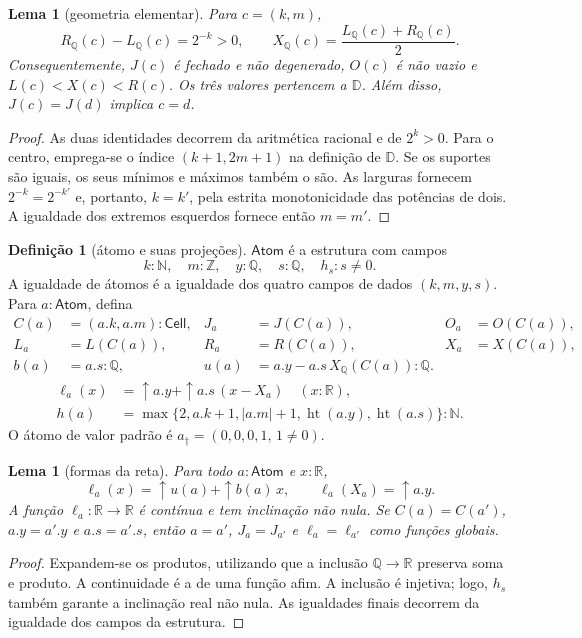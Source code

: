 \documentclass[12pt,a4paper]{article}
\theoremstyle{preciso}
\newtheorem{lema}[teorema]{Lema}
\theoremstyle{definition}
\newtheorem{definicao}[teorema]{Definição}
\newcommand{\N}{\mathbb N}
\newcommand{\Z}{\mathbb Z}
\newcommand{\Q}{\mathbb Q}
\newcommand{\R}{\mathbb R}
\newcommand{\D}{\mathbb D}
\newcommand{\Atoms}{\mathsf{Atom}}
\newcommand{\Cell}{\mathsf{Cell}}
\newcommand{\htq}{\operatorname{ht}}
\theoremstyle{preciso}
\theoremstyle{preciso}
\theoremstyle{preciso}
\theoremstyle{preciso}
\theoremstyle{definition}
\theoremstyle{preciso}
\theoremstyle{definition}
\theoremstyle{preciso}
\theoremstyle{preciso}
\theoremstyle{definition}
\begin{document}
\begin{lema}[geometria elementar]\label{map:normalizacao:2.3}\label{normalizacao:lem:geometry}
Para $c=(k,m)$,
\[
 R_\Q(c)-L_\Q(c)=2^{-k}>0,\qquad
 X_\Q(c)=\frac{L_\Q(c)+R_\Q(c)}2.
\]
Consequentemente, $J(c)$ é fechado e não degenerado, $O(c)$ é não
vazio e $L(c)<X(c)<R(c)$. Os três valores pertencem a $\D$.
Além disso, $J(c)=J(d)$ implica $c=d$.
\end{lema}
\begin{proof}
As duas identidades decorrem da aritmética racional e de $2^k>0$.
Para o centro, emprega-se o índice $(k+1,2m+1)$ na definição de $\D$.
Se os suportes são iguais, os seus mínimos e máximos também o são.
As larguras fornecem $2^{-k}=2^{-k'}$ e, portanto, $k=k'$, pela estrita
monotonicidade das potências de dois. A igualdade dos extremos
esquerdos fornece então $m=m'$.
\end{proof}

\begin{definicao}[átomo e suas projeções]\label{map:normalizacao:2.4}\label{normalizacao:def:atom}
$\Atoms$ é a estrutura com campos
\[
 k:\N,\quad m:\Z,\quad y:\Q,\quad s:\Q,\quad h_s:s\ne0.
\]
A igualdade de átomos é a igualdade dos quatro campos de dados
$(k,m,y,s)$. Para $a:\Atoms$, defina
\begin{align*}
 C(a)&=(a.k,a.m):\Cell, & J_a&=J(C(a)), & O_a&=O(C(a)),\\
 L_a&=L(C(a)),&R_a&=R(C(a)),&X_a&=X(C(a)),\\
 b(a)&=a.s:\Q,& u(a)&=a.y-a.s\,X_\Q(C(a)):\Q.
\end{align*}
\begin{align*}
 \ell_a(x)&=\uparrow a.y+\uparrow a.s\,(x-X_a)\quad(x:\R),\\
 h(a)&=\max\{2,a.k+1,|a.m|+1,\htq(a.y),\htq(a.s)\}:\N.
\end{align*}
O átomo de valor padrão é
$a_\dagger=(0,0,0,1,\,1\ne0)$.
\end{definicao}

\begin{lema}[formas da reta]\label{map:normalizacao:2.5}\label{normalizacao:lem:line}
Para todo $a:\Atoms$ e $x:\R$,
\[
 \ell_a(x)=\uparrow u(a)+\uparrow b(a)\,x,\qquad
 \ell_a(X_a)=\uparrow a.y.
\]
A função $\ell_a:\R\to\R$ é contínua e tem inclinação não nula.
Se $C(a)=C(a')$, $a.y=a'.y$ e $a.s=a'.s$, então
$a=a'$, $J_a=J_{a'}$ e $\ell_a=\ell_{a'}$ como funções globais.
\end{lema}
\begin{proof}
Expandem-se os produtos, utilizando que a inclusão $\Q\to\R$ preserva soma
e produto. A continuidade é a de uma função afim. A inclusão é
injetiva; logo, $h_s$ também garante a inclinação real não nula.
As igualdades finais decorrem da igualdade dos campos da estrutura.
\end{proof}
\end{document}
